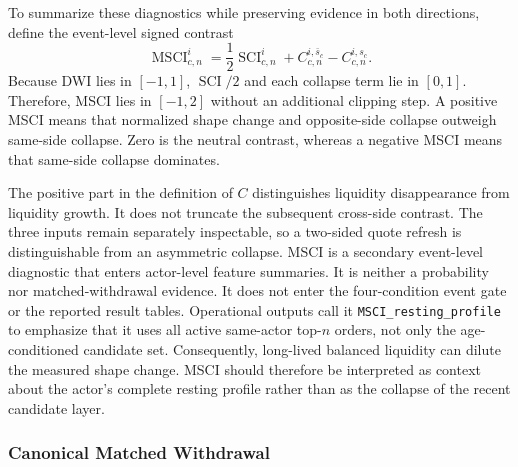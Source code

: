 \documentclass[11pt]{article}
\begin{document}
To summarize these diagnostics while preserving evidence in both directions, define the event-level signed contrast
\begin{equation}
    \operatorname{MSCI}^{i}_{c,n}
    =\frac{1}{2}\operatorname{SCI}^{i}_{c,n}
     +C^{i,\bar{s}_c}_{c,n}
     -C^{i,s_c}_{c,n}.
    \label{eq:signed_msci}
\end{equation}
Because DWI lies in $[-1,1]$, $\operatorname{SCI}/2$ and each collapse term lie in $[0,1]$. Therefore, MSCI lies in
$[-1,2]$ without an additional clipping step. A positive MSCI means that normalized shape change and opposite-side collapse
outweigh same-side collapse. Zero is the neutral contrast, whereas a negative MSCI means that same-side collapse dominates.

The positive part in the definition of $C$ distinguishes liquidity disappearance from liquidity growth. It does not truncate
the subsequent cross-side contrast. The three inputs remain separately inspectable, so a two-sided quote refresh is
distinguishable from an asymmetric collapse. MSCI is a secondary event-level diagnostic that enters actor-level feature
summaries. It is neither a probability nor matched-withdrawal evidence. It does not enter the four-condition event gate or the
reported result tables. Operational outputs call it \texttt{MSCI\_resting\_profile} to emphasize that it uses all active
same-actor top-$n$ orders, not only the age-conditioned candidate set. Consequently, long-lived balanced liquidity can dilute
the measured shape change. MSCI should therefore be interpreted as context about the actor's complete resting profile rather
than as the collapse of the recent candidate layer.

\subsubsection{Canonical Matched Withdrawal}
\label{subsec:canonical_matched_withdrawal}
\end{document}
